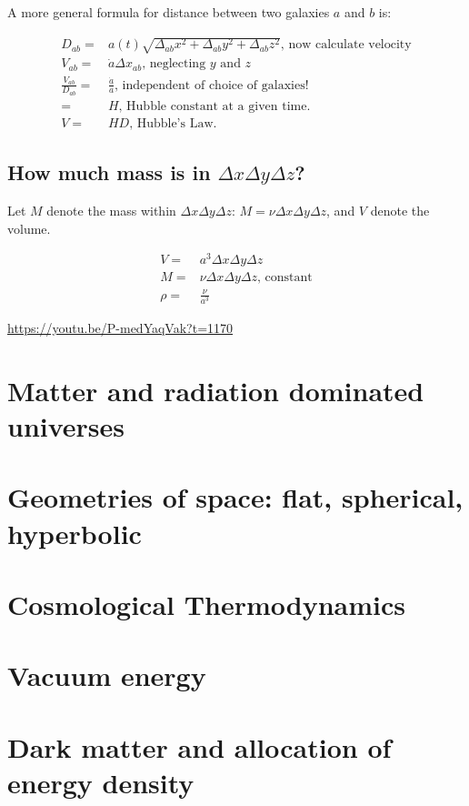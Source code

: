 \documentclass[]{article}
\begin{document}
 A more general formula for distance between two galaxies $a$ and $b$ is:
 
 \begin{align*}
 	D_{ab}=&a(t) \sqrt{\Delta_{ab} x^2 + \Delta_{ab} y^2 + \Delta_{ab} z^2} \text{, now calculate velocity}\\
 	V_{ab}=&\dot{a} \Delta x_{ab} \text{, neglecting $y$ and $z$}\\
 	\frac{V_{ab}}{D_{ab}} =& \frac{\dot{a}}{a} \text{, independent of choice of galaxies!}\\
 	=& H \text{, Hubble constant at a given time.}\\
 	V =& H D \text{, Hubble's Law.}
\end{align*}
 
\subsection{How much mass is in $\Delta x \Delta y \Delta z$?}

Let $M$ denote the mass within $\Delta x \Delta y \Delta z$: $M = \nu \Delta x \Delta y \Delta z$, and $V$ denote the volume.

\begin{align*}
	V =& a^3 \Delta x \Delta y \Delta z\\
	M =& \nu \Delta x \Delta y \Delta z \text{, constant}\\
	\rho =& \frac{\nu}{a^3}
\end{align*}




\url{https://youtu.be/P-medYaqVak?t=1170}

\section{Matter and radiation dominated universes}
\section{Geometries of space: flat, spherical, hyperbolic}
\section{Cosmological Thermodynamics}
\section{Vacuum energy}
\section{Dark matter and allocation of energy density}
\end{document}
